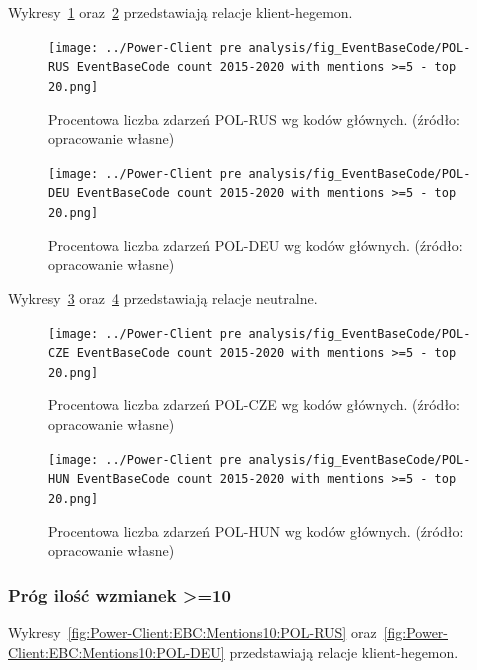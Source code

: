 \documentclass[11pt]{report}
\begin{document}
    Wykresy~\ref{fig:Power-Client:EBC:Mentions:POL-RUS} oraz~\ref{fig:Power-Client:EBC:Mentions:POL-DEU} przedstawiają relacje klient-hegemon.

    \begin{figure}[!htp]
        \centering
        \texttt{[image: ../Power-Client pre analysis/fig\_EventBaseCode/POL-RUS EventBaseCode count 2015-2020 with mentions >=5 - top 20.png]}
        \caption{Procentowa liczba zdarzeń POL-RUS wg kodów głównych. (źródło: opracowanie własne)}
        \label{fig:Power-Client:EBC:Mentions:POL-RUS}
    \end{figure}

    \begin{figure}[!htp]
        \centering
        \texttt{[image: ../Power-Client pre analysis/fig\_EventBaseCode/POL-DEU EventBaseCode count 2015-2020 with mentions >=5 - top 20.png]}
        \caption{Procentowa liczba zdarzeń POL-DEU wg kodów głównych. (źródło: opracowanie własne)}
        \label{fig:Power-Client:EBC:Mentions:POL-DEU}
    \end{figure}

    Wykresy~\ref{fig:Power-Client:EBC:Mentions:POL-CZE} oraz~\ref{fig:Power-Client:EBC:Mentions:POL-HUN} przedstawiają relacje neutralne.

    \begin{figure}[!htp]
        \centering
        \texttt{[image: ../Power-Client pre analysis/fig\_EventBaseCode/POL-CZE EventBaseCode count 2015-2020 with mentions >=5 - top 20.png]}
        \caption{Procentowa liczba zdarzeń POL-CZE wg kodów głównych. (źródło: opracowanie własne)}
        \label{fig:Power-Client:EBC:Mentions:POL-CZE}
    \end{figure}

    \begin{figure}[!htp]
        \centering
        \texttt{[image: ../Power-Client pre analysis/fig\_EventBaseCode/POL-HUN EventBaseCode count 2015-2020 with mentions >=5 - top 20.png]}
        \caption{Procentowa liczba zdarzeń POL-HUN wg kodów głównych. (źródło: opracowanie własne)}
        \label{fig:Power-Client:EBC:Mentions:POL-HUN}
    \end{figure}

    \subsubsection{Próg ilość wzmianek >=10}\label{subsubsec:ebc:próg-ilość-wzmianek->=10}

    Wykresy~\ref{fig:Power-Client:EBC:Mentions10:POL-RUS} oraz~\ref{fig:Power-Client:EBC:Mentions10:POL-DEU} przedstawiają relacje klient-hegemon.
\end{document}
